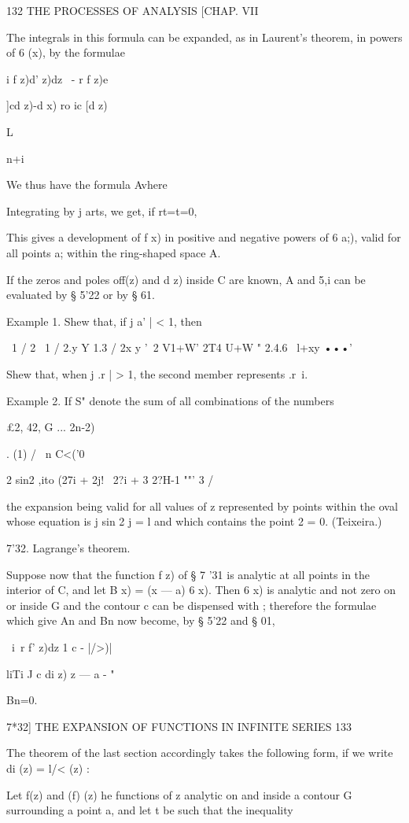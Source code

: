 132 THE PROCESSES OF ANALYSIS [CHAP. VII

The integrals in this formula can be expanded, as in Laurent's
theorem, in powers of 6 (x), by the formulae

i f z)d' z)dz \ - r f z)e

]cd z)-d x) ro ic [d z)\

L

n+i

We thus have the formula Avhere

Integrating by j arts, we get, if rt=t=0,

This gives a development of f x) in positive and negative powers of 6
a;), valid for all points a; within the ring-shaped space A.

If the zeros and poles off(z) and d z) inside C are known, A and 5,i
can be evaluated by § 5'22 or by § 61.

Example 1. Shew that, if j a' | < 1, then

\ 1 / 2 \ 1 / 2.y Y 1.3 / 2x y '~2 V1+W' 2T4 U+W " 2.4.6 \ l+xy •••'

Shew that, when j .r | > 1, the second member represents .r~i.

Example 2. If S" denote the sum of all combinations of the numbers

£2, 42, G ... 2n-2)%

. (1) / \ n C<('0

2 sin2 ,ito (27i + 2j! \ 2?i + 3 2?H-1 ""' 3 /

the expansion being valid for all values of z represented by points
within the oval whose equation is j sin 2 j = l and which contains the
point 2 = 0. (Teixeira.)

7'32. Lagrange's theorem.

Suppose now that the function f z) of § 7 '31 is analytic at all
points in the interior of C, and let B x) = (x — a) 6 x). Then 6 x) is
analytic and not zero on or inside G and the contour c can be
dispensed with ; therefore the formulae which give An and Bn now
become, by § 5'22 and § 01,

\ i\ r f' z)dz 1 c - |/>)|

liTi J c di z) z — a - "

Bn=0.

7*32] THE EXPANSION OF FUNCTIONS IN INFINITE SERIES 133

The theorem of the last section accordingly takes the following form,
if we write di (z) = l/< (z) :

Let f(z) and (f) (z) he functions of z analytic on and inside a
contour G surrounding a point a, and let t be such that the inequality

